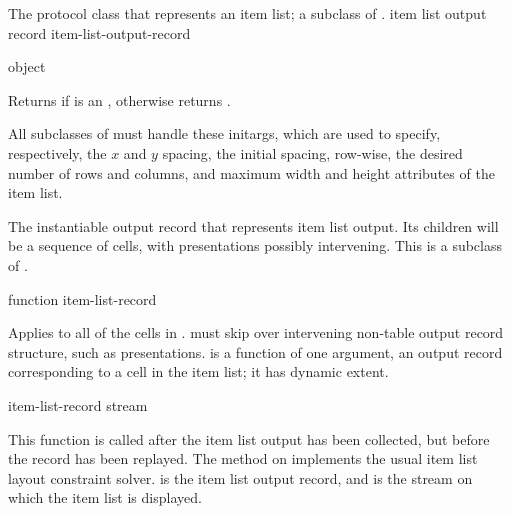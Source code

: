 
The protocol class that represents an item list; a subclass of
.
 {item list output record} {item-list-output-record}

 {object}

Returns  if  is an ,
otherwise returns .


All subclasses of  must handle these initargs, which
are used to specify, respectively, the $x$ and $y$ spacing, the initial spacing,
row-wise, the desired number of rows and columns, and maximum width and height
attributes of the item list.


The instantiable output record that represents item list output.  Its children
will be a sequence of cells, with presentations possibly intervening.  This is a
subclass of .

 {function item-list-record}

Applies  to all of the cells in .
 must skip over intervening non-table output record
structure, such as presentations.   is a function of one argument,
an output record corresponding to a cell in the item list; it has dynamic
extent.

 {item-list-record stream}

This function is called after the item list output has been collected, but
before the record has been replayed.  The method on
 implements the usual item list layout
constraint solver.   is the item list output record, and
 is the stream on which the item list is displayed.

